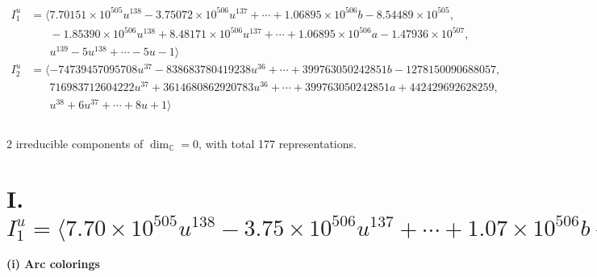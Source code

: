 \documentclass[1p]{elsarticle_modified}
\theoremstyle{definition}
\begin{document}
\begin{align*}
I^u_{1}&=\langle 
7.70151\times10^{505} u^{138}-3.75072\times10^{506} u^{137}+\cdots+1.06895\times10^{506} b-8.54489\times10^{505},\\
\phantom{I^u_{1}}&\phantom{= \langle  }-1.85390\times10^{506} u^{138}+8.48171\times10^{506} u^{137}+\cdots+1.06895\times10^{506} a-1.47936\times10^{507},\\
\phantom{I^u_{1}}&\phantom{= \langle  }u^{139}-5 u^{138}+\cdots-5 u-1\rangle \\
I^u_{2}&=\langle 
-74739457095708 u^{37}-838683780419238 u^{36}+\cdots+399763050242851 b-1278150090688057,\\
\phantom{I^u_{2}}&\phantom{= \langle  }716983712604222 u^{37}+3614680862920783 u^{36}+\cdots+399763050242851 a+442429692628259,\\
\phantom{I^u_{2}}&\phantom{= \langle  }u^{38}+6 u^{37}+\cdots+8 u+1\rangle \\
\\
\end{align*}
\raggedright * 2 irreducible components of $\dim_{\mathbb{C}}=0$, with total 177 representations.\\
\newpage
\renewcommand{\arraystretch}{1}
\centering \section*{I. $I^u_{1}= \langle 7.70\times10^{505} u^{138}-3.75\times10^{506} u^{137}+\cdots+1.07\times10^{506} b-8.54\times10^{505},\;-1.85\times10^{506} u^{138}+8.48\times10^{506} u^{137}+\cdots+1.07\times10^{506} a-1.48\times10^{507},\;u^{139}-5 u^{138}+\cdots-5 u-1 \rangle$}
\flushleft \textbf{(i) Arc colorings}\\
\end{document}

